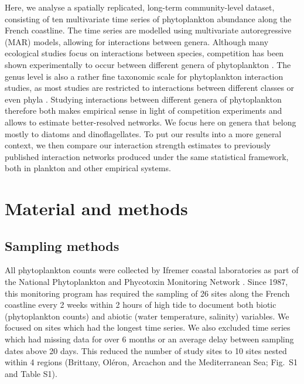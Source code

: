 \documentclass[10pt]{article}
\begin{document}
Here, we analyse a spatially replicated, long-term community-level
dataset, consisting of ten multivariate time series of phytoplankton
abundance along the French coastline. The time series are modelled
using multivariate autoregressive (MAR) models, allowing for interactions
between genera. Although many ecological studies focus on interactions
between species, competition has been shown experimentally to occur
between different genera of phytoplankton \citep{titman_ecological_1976,descamps-julien_stable_2005}.
The genus level is also a rather fine taxonomic scale for phytoplankton
interaction studies, as most studies are restricted to interactions
between different classes or even phyla \citep{ives_estimating_2003,hampton_sixty_2008,griffiths_phytoplankton_2015}.
Studying interactions between different genera of phytoplankton therefore
both makes empirical sense in light of competition experiments and
allows to estimate better-resolved networks. We focus here on genera
that belong mostly to diatoms and dinoflagellates. To put our results
into a more general context, we then compare our interaction strength
estimates to previously published interaction networks produced under
the same statistical framework, both in plankton and other empirical
systems.

\section*{Material and methods}

\subsection*{Sampling methods}

All phytoplankton counts were collected by Ifremer coastal laboratories
as part of the National Phytoplankton and Phycotoxin Monitoring Network
\citep{REPHY_db}. Since 1987, this monitoring program has required
the sampling of 26 sites along the French coastline every 2 weeks
within 2 hours of high tide to document both biotic (phytoplankton
counts) and abiotic (water temperature, salinity) variables. We focused
on sites which had the longest time series. We also excluded time
series which had missing data for over 6 months or an average delay
between sampling dates above 20 days. This reduced the number of study
sites to 10 sites nested within 4 regions (Brittany, Oléron, Arcachon
and the Mediterranean Sea; Fig.~S1 and Table S1).
\end{document}
